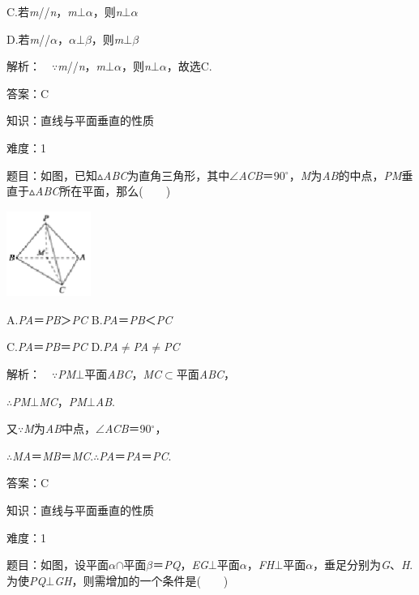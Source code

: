 \documentclass{article} %
\begin{document}
C.若\textit{m}//\textit{n}，\textit{m}$\mathrm{\bot}$\textit{$\alpha$}，则\textit{n}$\mathrm{\bot}$\textit{$\alpha$}

D.若\textit{m}//\textit{$\alpha$}，\textit{$\alpha$}$\mathrm{\bot}$\textit{$\beta$}，则\textit{m}$\mathrm{\bot}$\textit{$\beta$}

解析：　$\mathrm{\because}$\textit{m}//\textit{n}，\textit{m}$\mathrm{\bot}$\textit{$\alpha$}，则\textit{n}$\mathrm{\bot}$\textit{$\alpha$}，故选C.

答案：C

知识：直线与平面垂直的性质

难度：1

题目：如图，已知$\mathrm{\vartriangle}$\textit{ABC}为直角三角形，其中$\mathrm{\angle}$\textit{ACB}＝90$\mathrm{{}^\circ}$，\textit{M}为\textit{AB}的中点，\textit{PM}垂直于$\mathrm{\vartriangle}$\textit{ABC}所在平面，那么(　　)

\includegraphics*[width=1.08in, height=1.11in, keepaspectratio=false]{image231}

A.\textit{PA}＝\textit{PB}＞\textit{PC  }B.\textit{PA}＝\textit{PB}＜\textit{PC}

C.\textit{PA}＝\textit{PB}＝\textit{PC  }D.\textit{PA}$\mathrm{\neq}$\textit{PA}$\mathrm{\neq}$\textit{PC}

解析：　$\mathrm{\because}$\textit{PM}$\mathrm{\bot}$平面\textit{ABC}，\textit{MC}$\mathrm{\subset }$平面\textit{ABC}，

$\mathrm{\therefore}$\textit{PM}$\mathrm{\bot}$\textit{MC}，\textit{PM}$\mathrm{\bot}$\textit{AB}.

又$\mathrm{\because}$\textit{M}为\textit{AB}中点，$\mathrm{\angle}$\textit{ACB}＝90$\mathrm{{}^\circ}$，

$\mathrm{\therefore}$\textit{MA}＝\textit{MB}＝\textit{MC}.$\mathrm{\therefore}$\textit{PA}＝\textit{PA}＝\textit{PC}.

答案：C

知识：直线与平面垂直的性质

难度：1

题目：如图，设平面\textit{$\alpha$}$\mathrm{\cap}$平面\textit{$\beta$}＝\textit{PQ}，\textit{EG}$\mathrm{\bot}$平面\textit{$\alpha$}，\textit{FH}$\mathrm{\bot}$平面\textit{$\alpha$}，垂足分别为\textit{G}、\textit{H}.为使\textit{PQ}$\mathrm{\bot}$\textit{GH}，则需增加的一个条件是(　　)
\end{document}
